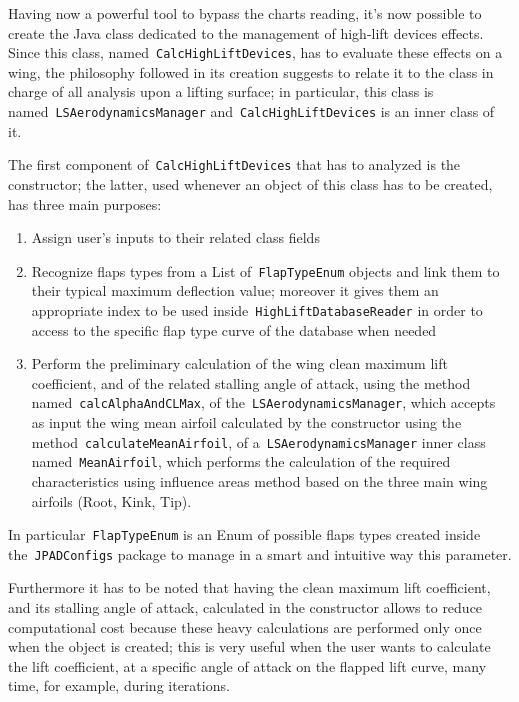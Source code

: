 \bigskip
\noindent
Having now a powerful tool to bypass the charts reading, it's now possible to create the Java class dedicated to the management of high-lift devices effects. Since this class, named~\lstinline[language=Java]!CalcHighLiftDevices!, has to evaluate these effects on a wing, the philosophy followed in its creation suggests to relate it to the class in charge of all analysis upon a lifting surface; in particular, this class is named~\lstinline[language=Java]!LSAerodynamicsManager! and~\lstinline[language=Java]!CalcHighLiftDevices! is an inner class of it.

\bigskip
\noindent
The first component of~\lstinline[language=Java]!CalcHighLiftDevices! that has to analyzed is the constructor; the latter, used whenever an object of this class has to be created, has three main purposes:

\begin{enumerate}
\item Assign user's inputs to their related class fields
\item Recognize flaps types from a \gls{List} of~\lstinline[language=Java]!FlapTypeEnum! objects and link them to their typical maximum deflection value; moreover it gives them an appropriate index to be used inside~\lstinline[language=Java]!HighLiftDatabaseReader! in order to access to the specific flap type curve of the database when needed
\item Perform the preliminary calculation of the wing clean maximum lift coefficient, and of the related stalling angle of attack, using the method named~\lstinline[language=Java]!calcAlphaAndCLMax!, of the~\lstinline[language=Java]!LSAerodynamicsManager!, which accepts as input the wing mean airfoil calculated by the constructor using the method~\lstinline[language=Java]!calculateMeanAirfoil!, of a~\lstinline[language=Java]!LSAerodynamicsManager! inner class named~\lstinline[language=Java]!MeanAirfoil!, which performs the calculation of the required characteristics using influence areas method based on the three main wing airfoils (Root, Kink, Tip).   
\end{enumerate}

\noindent
In particular~\lstinline[language=Java]!FlapTypeEnum! is an \gls{Enum}\cite{enumAPI} of possible flaps types created inside the~\lstinline[language=Java]!JPADConfigs! package to manage in a smart and intuitive way this parameter. 

Furthermore it has to be noted that having the clean maximum lift coefficient, and its stalling angle of attack, calculated in the constructor allows to reduce computational cost because these heavy calculations are performed only once when the object is created; this is very useful when the user wants to calculate the lift coefficient, at a specific angle of attack on the flapped lift curve, many time, for example, during iterations.  

